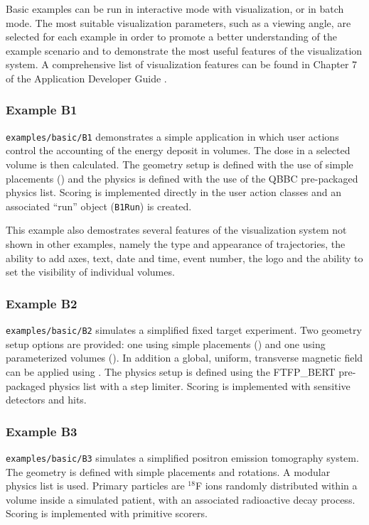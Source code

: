 Basic examples can be run in interactive mode with visualization, or in 
batch mode.  The most suitable visualization parameters, such as a viewing 
angle, are selected for each example in order to promote a better understanding
of the example scenario and to demonstrate the most useful features of the 
visualization system.  A comprehensive list of visualization features can be 
found in Chapter 7 of the Application Developer Guide \cite{bib:AppDevGuide}.

\subsubsection{Example B1}
\verb"examples/basic/B1" demonstrates a simple application in which user actions
control the accounting of the energy deposit in volumes.  The dose in a selected 
volume is then calculated.  The geometry setup is defined with the use of 
simple placements () and the physics is defined with the 
use of the QBBC pre-packaged physics list.  Scoring is implemented directly 
in the user action classes and an associated ``run'' object (\verb"B1Run")
is created.

This example also demostrates several features of the visualization system not
shown in other examples, namely the type and appearance of trajectories, the 
ability to add axes, text, date and time, event number, the \Gfour{} logo and
the ability to set the visibility of individual volumes.
  
\subsubsection{Example B2}
\verb"examples/basic/B2" simulates a simplified fixed target experiment. Two 
geometry setup options are provided: one using simple placements 
() and one using parameterized volumes 
().  In addition a global, uniform, transverse 
magnetic field can be applied using 
.  The physics setup
is defined using the FTFP\_BERT pre-packaged physics list with a step limiter.
Scoring is implemented with sensitive detectors and hits.

\subsubsection{Example B3} 
\verb"examples/basic/B3" simulates a simplified positron emission tomography
system.  The geometry is defined with simple placements and rotations.  A 
modular physics list is used.  Primary particles are $^{18}$F ions randomly 
distributed within a volume inside a simulated patient, with an associated 
radioactive decay process.  Scoring is implemented with \Gfour{} primitive 
scorers.

